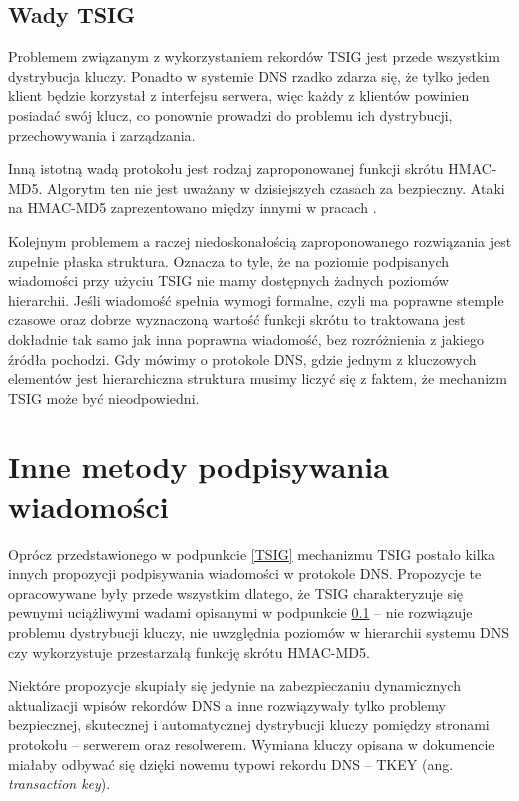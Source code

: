 \subsection{Wady TSIG}
\label{wady-tsig}
Problemem związanym z wykorzystaniem rekordów TSIG jest przede wszystkim dystrybucja kluczy. Ponadto w systemie DNS rzadko zdarza się,
że tylko jeden klient będzie korzystał z interfejsu serwera, więc każdy z klientów powinien posiadać swój klucz, co ponownie prowadzi
do problemu ich dystrybucji, przechowywania i zarządzania\cite{nask-tsig}.

Inną istotną wadą protokołu jest rodzaj zaproponowanej funkcji skrótu HMAC-MD5. Algorytm ten nie jest uważany w dzisiejszych czasach
za bezpieczny. Ataki na HMAC-MD5 zaprezentowano między innymi w pracach \cite{hmac-md5-attack, hmac-md5-cryptoanalisys}.

Kolejnym problemem a raczej niedoskonałością zaproponowanego rozwiązania jest zupełnie płaska struktura. Oznacza to tyle, że na
poziomie podpisanych wiadomości przy użyciu TSIG nie mamy dostępnych żadnych poziomów hierarchii. Jeśli wiadomość spełnia wymogi
formalne, czyli ma poprawne stemple czasowe oraz dobrze wyznaczoną wartość funkcji skrótu to traktowana jest dokładnie tak samo
jak inna poprawna wiadomość, bez rozróżnienia z jakiego źródła pochodzi. Gdy mówimy o protokole DNS, gdzie jednym z kluczowych
elementów jest hierarchiczna struktura musimy liczyć się z faktem, że mechanizm TSIG może być nieodpowiedni.

\section{Inne metody podpisywania wiadomości}
Oprócz przedstawionego w podpunkcie \ref{TSIG} mechanizmu TSIG postało kilka innych propozycji podpisywania wiadomości w protokole DNS.
Propozycje te opracowywane były przede wszystkim dlatego, że TSIG charakteryzuje się pewnymi uciążliwymi wadami opisanymi w podpunkcie
\ref{wady-tsig} -- nie rozwiązuje problemu dystrybucji kluczy, nie uwzględnia poziomów w hierarchii systemu DNS czy wykorzystuje
przestarzałą funkcję skrótu HMAC-MD5.

Niektóre propozycje skupiały się jedynie na zabezpieczaniu dynamicznych aktualizacji wpisów rekordów DNS \cite{RFC2137} a inne
rozwiązywały tylko problemy bezpiecznej, skutecznej i automatycznej dystrybucji kluczy pomiędzy stronami protokołu -- serwerem oraz
resolwerem\cite{RFC2930}. Wymiana kluczy opisana w dokumencie \cite{RFC2930} miałaby odbywać się dzięki nowemu typowi rekordu
DNS -- TKEY (ang. \textit{transaction key}).

